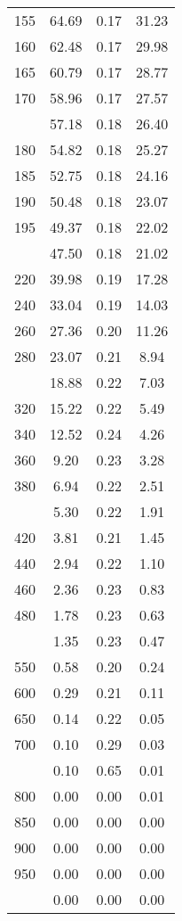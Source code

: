 \begin{table}[ht]
\begin{tabular}{lccc}
  155 & 64.69 & 0.17 & 31.23 \\ 
  160 & 62.48 & 0.17 & 29.98 \\ 
  165 & 60.79 & 0.17 & 28.77 \\ 
  170 & 58.96 & 0.17 & 27.57 \\ 
   \addlinespace
175 & 57.18 & 0.18 & 26.40 \\ 
  180 & 54.82 & 0.18 & 25.27 \\ 
  185 & 52.75 & 0.18 & 24.16 \\ 
  190 & 50.48 & 0.18 & 23.07 \\ 
  195 & 49.37 & 0.18 & 22.02 \\ 
   \addlinespace
200 & 47.50 & 0.18 & 21.02 \\ 
  220 & 39.98 & 0.19 & 17.28 \\ 
  240 & 33.04 & 0.19 & 14.03 \\ 
  260 & 27.36 & 0.20 & 11.26 \\ 
  280 & 23.07 & 0.21 & 8.94 \\ 
   \addlinespace
300 & 18.88 & 0.22 & 7.03 \\ 
  320 & 15.22 & 0.22 & 5.49 \\ 
  340 & 12.52 & 0.24 & 4.26 \\ 
  360 & 9.20 & 0.23 & 3.28 \\ 
  380 & 6.94 & 0.22 & 2.51 \\ 
   \addlinespace
400 & 5.30 & 0.22 & 1.91 \\ 
  420 & 3.81 & 0.21 & 1.45 \\ 
  440 & 2.94 & 0.22 & 1.10 \\ 
  460 & 2.36 & 0.23 & 0.83 \\ 
  480 & 1.78 & 0.23 & 0.63 \\ 
   \addlinespace
500 & 1.35 & 0.23 & 0.47 \\ 
  550 & 0.58 & 0.20 & 0.24 \\ 
  600 & 0.29 & 0.21 & 0.11 \\ 
  650 & 0.14 & 0.22 & 0.05 \\ 
  700 & 0.10 & 0.29 & 0.03 \\ 
   \addlinespace
750 & 0.10 & 0.65 & 0.01 \\ 
  800 & 0.00 & 0.00 & 0.01 \\ 
  850 & 0.00 & 0.00 & 0.00 \\ 
  900 & 0.00 & 0.00 & 0.00 \\ 
  950 & 0.00 & 0.00 & 0.00 \\ 
   \addlinespace
1000 & 0.00 & 0.00 & 0.00 \\ 
   \bottomrule
\end{tabular}
\end{table}
